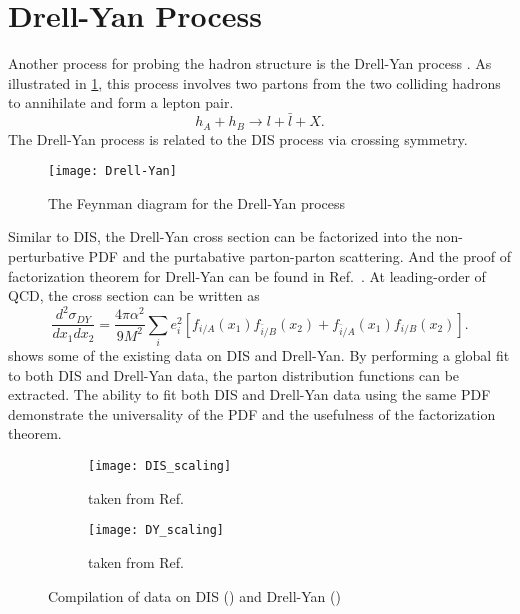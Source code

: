 \documentclass[../main.tex]{subfiles}
\begin{document}
\section{Drell-Yan Process}
\label{sec:DY}
Another process for probing the hadron structure is the Drell-Yan process \cite{drell1970}.
As illustrated in \cref{fig:DY}, this process involves two partons from the
two colliding hadrons to annihilate and form a lepton pair.
\begin{equation}
	h_A + h_B \rightarrow l + \bar{l} + X.
\end{equation}
The Drell-Yan process is related to the DIS process via crossing symmetry.
\begin{figure}[htbp!]
	\centering
	\texttt{[image: Drell-Yan]}
	\caption{The Feynman diagram for the Drell-Yan process}
	\label{fig:DY}
\end{figure}
Similar to DIS, the Drell-Yan cross section can be factorized into the non-perturbative
PDF and the purtabative parton-parton scattering. And the proof of factorization
theorem for Drell-Yan can be found in Ref.~\cite{collins1989}. At leading-order
of QCD, the cross section can be written as
\begin{equation}
	\frac{d^2\sigma_{DY}}{dx_{1}dx_{2}} = \frac{4\pi\alpha^2}{9M^2}\sum_i e^2_i
	\left[f_{i/A}\left(x_1\right)f_{\bar{i}/B}\left(x_2\right) +
	f_{\bar{i}/A}\left(x_1\right)f_{i/B}\left(x_2\right)
	\right].
	\label{eq:DY_cs}
\end{equation}
 shows some of the existing data on DIS and Drell-Yan. By
performing a global fit to both DIS and Drell-Yan data, the parton distribution
functions can be extracted. The ability to fit both DIS and Drell-Yan data using
the same PDF demonstrate the universality of the PDF and the usefulness of the
factorization theorem.
\begin{figure}[htbp!]
	\centering
	\begin{subfigure}{0.45\linewidth}
		\texttt{[image: DIS\_scaling]}
		\caption{taken from Ref.~\cite{theh1collaboration2003}}
		\label{subfig:DIS_scaling}
	\end{subfigure}
	\begin{subfigure}{0.45\linewidth}
		\texttt{[image: DY\_scaling]}
		\caption{taken from Ref.~\cite{mcgaughey1999}}
		\label{subfig:DY_scaling}
	\end{subfigure}
	\caption{Compilation of data on DIS () and
		Drell-Yan ()}
	\label{fig:scaling}
\end{figure}
\end{document}
